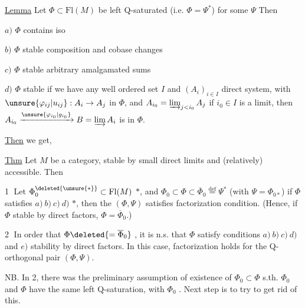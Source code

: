 \uline{Lemma} Let $\Phi\subset\mathrm{Fl}(M)$ be left Q-saturated (i.e. $\Phi=\Psi^*$) for some $\Psi$
Then 

$a)$ $\Phi$ contains iso

$b)$ $\Phi$ stable   composition and cobase changes

$c)$ $\Phi$ stable   arbitrary amalgamated sums 

$d)$ $\Phi$ stable 
if we have any well ordered set $I$ and $(A_i)_{i\in I}$ direct system, with $\unsure{\varphi_{ij}|u_{ij}}:A_i\to A_j$ in $\Phi$, and $A_{i_0}=\varinjlim_{j<i_0}A_j$ if $i_0\in I$ is a limit,
then  $A_{i_0}\xrightarrow{\unsure{\varphi_{i_0}|g_{i_0}}}B=\varinjlim A_i$ is in $\Phi$.

\uline{Then} we get,

\uline{Thm} Let $M$ be a category, stable by small direct limits and (relatively) accessible. Then

\textcircled{1}  Let $\Phi_0^{\deleted{\unsure{*}}}\subset\mathrm{Fl}(M)$ $*$, and $\Phi_0\subset\Phi\subset\overline\Phi_0\stackrel{\mathrm{def}}=\Psi^*$ (with $\Psi=\Phi_{0*}$)
if $\Phi$  satisfies $a)\ b)\ c)\ d)$ $*$, then the $(\Phi,\Psi)$ satisfies factorization condition. (Hence, if $\Phi$ stable by direct factors, $\Phi=\overline\Phi_0$.)

\textcircled{2}  In order that $\Phi\deleted{=\overline\Phi_0}$ , it is n.s. that $\Phi$ satisfy conditions $a)\ b)\ c)\ d)$ and $e)$ stability by direct factors. In this case, factorization holds for the Q-orthogonal pair $(\Phi,\Psi)$.

NB. In 2,  there was the preliminary assumption of existence of $\Phi_0\subset\Phi$ s.th. $\Phi_0$ and $\Phi$ have the same left Q-saturation, with $\Phi_0$ . Next step is to try to get rid of this.

